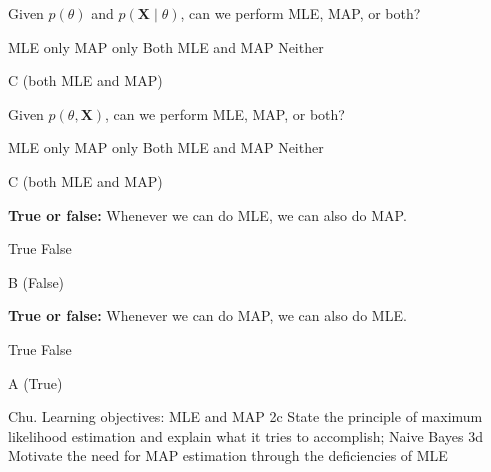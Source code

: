 \begin{parts}
\begin{subparts}
        \subpart[1]
            Given $p(\theta)$ and $p(\mathbf{X}\mid \theta)$, can we perform MLE, MAP, or both?
            
            \begin{checkboxes}
                \choice MLE only
                \choice MAP only
                \choice Both MLE and MAP
                \choice Neither
            \end{checkboxes}
            \begin{soln}
                C (both MLE and MAP)
            \end{soln}


        \subpart[1]
            Given $p(\theta, \mathbf{X})$, can we perform MLE, MAP, or both?
            
            \begin{checkboxes}
                \choice MLE only
                \choice MAP only
                \choice Both MLE and MAP
                \choice Neither
            \end{checkboxes}
            \begin{soln}
                C (both MLE and MAP)
            \end{soln}


        \subpart[1]
            \textbf{True or false:} Whenever we can do MLE, we can also do MAP.
            
            \begin{checkboxes}
                \choice True
                \choice False
            \end{checkboxes}
            \begin{soln}
                B (False)
            \end{soln}


        \subpart[1]
            \textbf{True or false:} Whenever we can do MAP, we can also do MLE.
            
            \begin{checkboxes}
                \choice True
                \choice False
            \end{checkboxes}
            \begin{soln}
                A (True)
            \end{soln}

    \end{subparts}
    
    
    \begin{qauthor}
       Chu. Learning objectives: MLE and MAP 2c State the principle of maximum likelihood estimation and explain what it tries to accomplish; Naive Bayes 3d Motivate the need for MAP estimation through the deficiencies of MLE
    \end{qauthor}



\end{parts}
